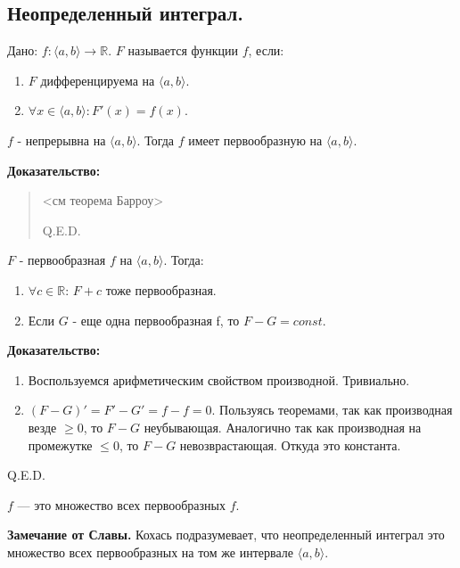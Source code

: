 \subsection{Неопределенный интеграл.}

 Дано: $f: \langle a,b\rangle \rightarrow \mathbb{R}$. $F$ называется  функции $f$, если:

\begin{enumerate}
    \item $F$ дифференцируема на $\langle a,b\rangle$.

    \item $\forall x \in \langle a,b\rangle: F'(x) = f(x) $.
\end{enumerate}


$f$ - непрерывна на $\langle a,b \rangle$. Тогда $f$ имеет первообразную на $\langle a,b\rangle$.

\textbf{Доказательство:}
\begin{quote}
    <см теорема Барроу>
    
    \hfill Q.E.D.
\end{quote}


$F$ - первообразная $f$ на $\langle a,b \rangle$. Тогда:
\begin{enumerate}
    \item $\forall c \in \mathbb{R}$: $F + c$ тоже первообразная.
    \item Если $G$ - еще одна первообразная f, то $F - G = const$.
\end{enumerate}
\textbf{Доказательство:}

    \begin{enumerate}
        \item Воспользуемся арифметическим свойством производной. Тривиально.
        \item $(F-G)' = F' -G' =f-f= 0$. Пользуясь теоремами, так как производная везде $\geq 0$, то $F-G$ неубывающая. Аналогично так как производная на промежутке $\leq 0 $, то $F-G$ невозврастающая. Откуда это константа.
    \end{enumerate}
    \hfill Q.E.D.

 $f$ --- это множество всех первообразных $f$.

\textbf{Замечание от Славы.} Кохась подразумевает, что неопределенный интеграл это множество всех первообразных на том же интервале $\langle a,b \rangle$.

